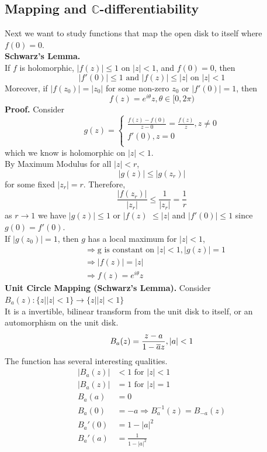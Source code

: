 \documentclass[11pt]{article}
\begin{document}
\subsection{Mapping and $\mathbb{C}$-differentiability}
Next we want to study functions that map the open disk to itself where $f(0) = 0$. \\
\newline
\textbf{Schwarz's Lemma.}\\
If $f$ is holomorphic, $|f(z)| \leqslant 1$ on $|z| < 1$, and $f(0) = 0$, then 
\begin{equation*}
|f'(0)| \leqslant 1 \mbox{ and } |f(z)| \leqslant |z| \mbox{ on } |z| < 1
\end{equation*}
Moreover, if $|f(z_0)| = |z_0|$ for some non-zero $z_0$ or $|f'(0)| = 1$, then 
$$f(z) = e^{i\theta}z, \theta \in [0, 2\pi)$$
\textbf{Proof.} Consider
\[ 
g(z) = 
\begin{cases} 
	\frac{f(z) - f(0)}{z - 0} = \frac{f(z)}{z}, z \neq 0 \\
	f'(0), z = 0\\
   \end{cases}
\]
which we know is holomorphic on $|z| < 1$. \\
By Maximum Modulus for all $|z| < r$,
$$|g(z)| \leqslant |g(z_r)|$$
for some fixed $|z_r| = r$. 
Therefore, 
$$\frac{|f(z_r)|}{|z_r|} \leqslant \frac{1}{|z_r|} = \frac{1}{r}$$
as $r \to 1$ we have $|g(z)| \leqslant 1$ or $|f(z)$ $\leqslant |z|$ and $|f'(0)| \leqslant 1$ since $g(0) = f'(0)$. \\
If $|g(z_0)| = 1$, then $g$ has a local maximum for $|z| < 1$, 
\begin{align*}
&\Rightarrow \mbox{g is constant on } |z| < 1, |g(z)| = 1\\
&\Rightarrow |f(z)| = |z| \\
&\Rightarrow f(z) = e^{i\theta}z
\end{align*} 
\newline 
\textbf{Unit Circle Mapping (Schwarz's Lemma).} Consider $B_a(z): \{z| |z| < 1\} \to \{z| |z| < 1\}$ \\
It is a invertible, bilinear transform from the unit disk to itself, or an automorphism on the unit disk. 
$$B_a(z) = \frac{z - a}{1 - \overline{a}z}, |a| < 1$$
The function has several interesting qualities. 
\begin{align*}
|B_a(z)| &< 1 \mbox{ for } |z| < 1 \\
|B_a(z)| &= 1 \mbox{ for } |z| = 1 \\
B_a(a) &= 0\\
B_a(0) &= -a \Rightarrow B_a^{-1}(z) = B_{-a}(z) \\
B_a'(0) &= 1 - |a|^2 \\
B_a'(a) &= \frac{1}{1 - |a|^2}
\end{align*}
\end{document}

